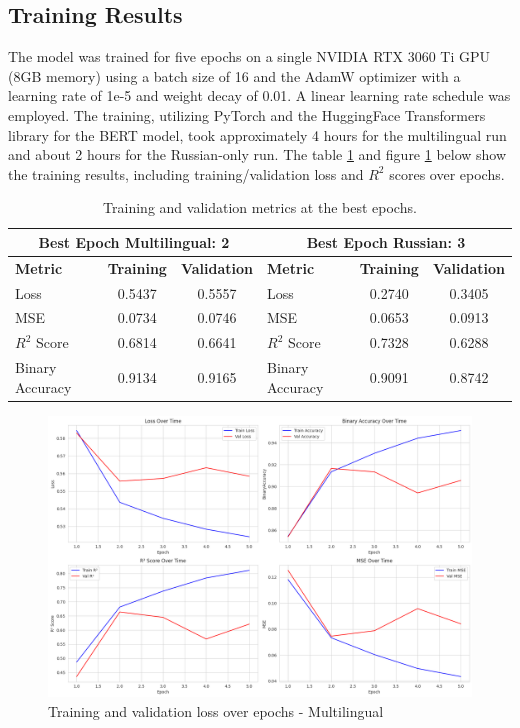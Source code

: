 \documentclass[twoside]{ctuthesis}
\theoremstyle{plain}
\theoremstyle{definition}
\theoremstyle{note}
\begin{document}
\subsection{Training Results}

The model was trained for five epochs on a single NVIDIA RTX 3060 Ti GPU (8GB memory) using a batch size of 16 and the AdamW optimizer with a learning rate of 1e-5 and weight decay of 0.01. A linear learning rate schedule was employed. The training, utilizing PyTorch and the HuggingFace Transformers library for the BERT model, took approximately 4 hours for the multilingual run and about 2 hours for the Russian-only run. The table \ref{tab:combined_best_epoch_results} and figure \ref{fig:training_stats} below show the training results, including training/validation loss and $R^2$ scores over epochs.\par

\begin{table}[ht]
  \centering
  \caption{Training and validation metrics at the best epochs.}
  \label{tab:combined_best_epoch_results}
  \begin{tabular}{lcc|lcc}
    \toprule
    \multicolumn{3}{c|}{\textbf{Best Epoch Multilingual: 2}} & \multicolumn{3}{c}{\textbf{Best Epoch Russian: 3}} \\
    \midrule
    \textbf{Metric} & \textbf{Training} & \textbf{Validation} & \textbf{Metric} & \textbf{Training} & \textbf{Validation} \\
    \midrule
 Loss      & 0.5437 & 0.5557 & Loss      & 0.2740 & 0.3405 \\
 MSE       & 0.0734 & 0.0746 & MSE       & 0.0653 & 0.0913 \\
    $R^2$ Score   & 0.6814 & 0.6641 & $R^2$ Score   & 0.7328 & 0.6288 \\
 Binary Accuracy & 0.9134 & 0.9165 & Binary Accuracy & 0.9091 & 0.8742 \\
    \bottomrule
  \end{tabular}
\end{table}


\begin{figure}[htbp]
  \centering
  \includegraphics[scale=0.33]{figures/training_full.png}
  \caption{Training and validation loss over epochs - Multilingual}
  \label{fig:training_stats}
\end{figure}
\end{document}
